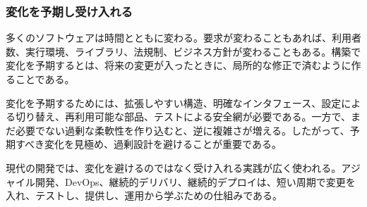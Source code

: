 \subsubsection{変化を予期し受け入れる}

多くのソフトウェアは時間とともに変わる。要求が変わることもあれば、利用者数、実行環境、ライブラリ、法規制、ビジネス方針が変わることもある。構築で変化を予期するとは、将来の変更が入ったときに、局所的な修正で済むように作ることである。

変化を予期するためには、拡張しやすい構造、明確なインタフェース、設定による切り替え、再利用可能な部品、テストによる安全網が必要である。一方で、まだ必要でない過剰な柔軟性を作り込むと、逆に複雑さが増える。したがって、予期すべき変化を見極め、過剰設計を避けることが重要である。

現代の開発では、変化を避けるのではなく受け入れる実践が広く使われる。アジャイル開発、DevOps、継続的デリバリ、継続的デプロイは、短い周期で変更を入れ、テストし、提供し、運用から学ぶための仕組みである。
